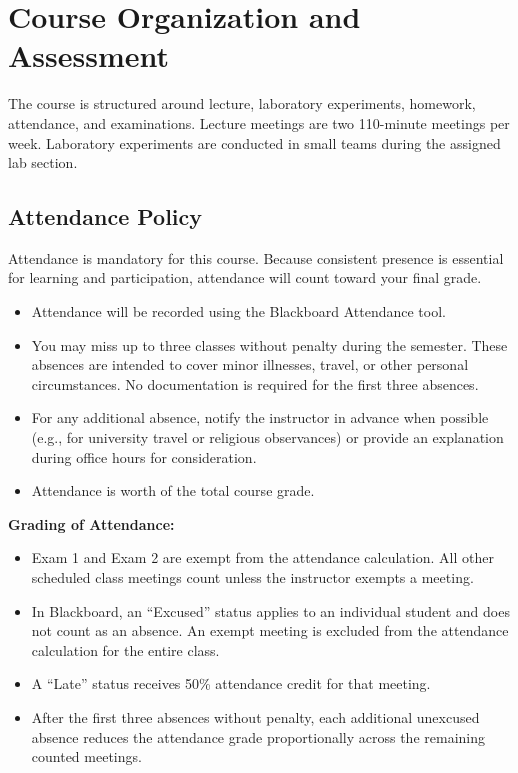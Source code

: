 \section*{Course Organization and Assessment}
The course is structured around lecture, laboratory experiments, homework, attendance, and examinations. Lecture meetings are two 110-minute meetings per week. Laboratory experiments are conducted in small teams during the assigned lab section.

\subsection*{Attendance Policy}
Attendance is mandatory for this course. Because consistent presence is essential for learning and participation, attendance will count toward your final grade.
\begin{itemize}
\item Attendance will be recorded using the Blackboard Attendance tool.
\item You may miss up to three classes without penalty during the semester. These absences are intended to cover minor illnesses, travel, or other personal circumstances. No documentation is required for the first three absences.
\item For any additional absence, notify the instructor in advance when possible (e.g., for university travel or religious observances) or provide an explanation during office hours for consideration.
\item Attendance is worth \AttendanceWeight{} of the total course grade.
\end{itemize}
\textbf{Grading of Attendance:}
\begin{itemize}
\item Exam 1 and Exam 2 are exempt from the attendance calculation. All other scheduled class meetings count unless the instructor exempts a meeting.
\item In Blackboard, an ``Excused'' status applies to an individual student and does not count as an absence. An exempt meeting is excluded from the attendance calculation for the entire class.
\item A ``Late'' status receives 50\% attendance credit for that meeting.
\item After the first three absences without penalty, each additional unexcused absence reduces the attendance grade proportionally across the remaining counted meetings.
\end{itemize}

